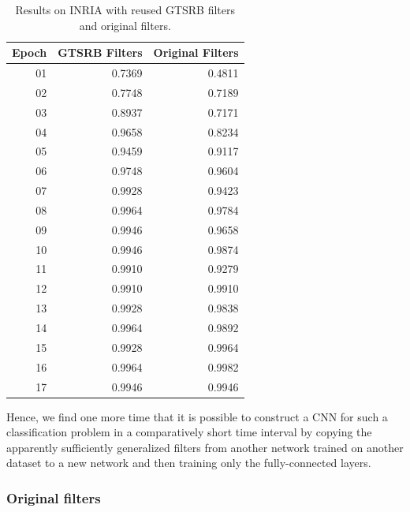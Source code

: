 \documentclass[11pt, a4paper]{article}
\begin{document}
\begin{table}[h!]
	\centering
	\begin{tabular}{|r|rr|}
		\hline
		Epoch & GTSRB Filters & Original Filters\\ \hline
		01 & 0.7369 & 0.4811\\
		02 & 0.7748 & 0.7189\\
		03 & 0.8937 & 0.7171\\
		04 & 0.9658 & 0.8234\\
		05 & 0.9459 & 0.9117\\
		06 & 0.9748 & 0.9604\\
		07 & 0.9928 & 0.9423\\
		08 & 0.9964 & 0.9784\\
		09 & 0.9946 & 0.9658\\
		10 & 0.9946 & 0.9874\\
		11 & 0.9910 & 0.9279\\
		12 & 0.9910 & 0.9910\\
		13 & 0.9928 & 0.9838\\
		14 & 0.9964 & 0.9892\\
		15 & 0.9928 & 0.9964\\
		16 & 0.9964 & 0.9982\\
		17 & 0.9946 & 0.9946\\ \hline
	\end{tabular}

	\caption{Results on INRIA with reused GTSRB filters and original filters. }
	\label{tab:inria-results}
\end{table}

Hence, we find one more time that it is possible to construct a CNN for such a classification problem in a comparatively short time interval by copying the apparently sufficiently generalized filters from another network trained on another dataset to a new network and then training only the fully-connected layers.

\subsubsection{Original filters}
\end{document}
